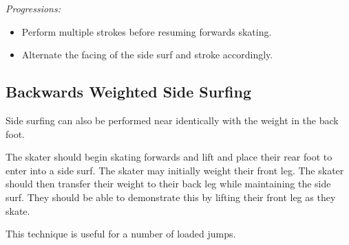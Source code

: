 {\it Progressions:}
\begin{itemize}
\item Perform multiple strokes before resuming forwards skating.  
\item Alternate the facing of the side surf and stroke accordingly. 
\end{itemize}


\subsection*{Backwards Weighted Side Surfing}

Side surfing can also be performed near identically with the weight in the back foot. 

The skater should begin skating forwards and lift and place their rear foot to enter into a side surf.
The skater may initially weight their front leg. 
The skater should then transfer their weight to their back leg while maintaining the side surf.
They should be able to demonstrate this by lifting their front leg as they skate.

This technique is useful for a number of loaded jumps.
